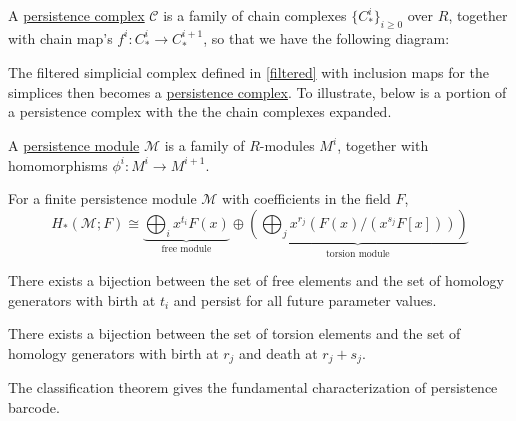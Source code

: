 \begin{defn}
A \underline{persistence complex} $\mathscr{C}$ is a family of chain complexes $\{C^i_*\}_{i\geq 0 }$ over $R$, together with chain map's $f^i: C^i_* \to C^{i+1}_*$, so that we have the following diagram:


The filtered simplicial complex defined in \ref{filtered} with inclusion maps for the simplices then becomes a \underline{persistence complex}. To illustrate, below is a portion of a persistence complex with the the chain complexes expanded. 

\end{defn}

\begin{defn}
A \underline{persistence module} $\mathscr{M}$ is a family of $R$-modules $M^i$, together with homomorphisms $\phi^i: M^i \to M^{i+1}$.
\end{defn}

\begin{thm}
    For a finite persistence module $\mathscr{M}$ with coefficients in the field $F$, 
    \begin{equation}
        H_*(\mathscr{M}; F) \cong \underbrace{\bigoplus_i x^{t_i}F(x)}_\text{free module} \oplus  \underbrace{\left(\bigoplus_j x^{r_j}(F(x)/(x^{s_j}F[x]))\right)}_\text{torsion module}
    \end{equation}
    
    There exists a bijection between the set of free elements and the set of homology generators with birth at $t_i$ and persist for all future parameter values. 
    
    There exists a bijection between the set of torsion elements and the set of homology generators with birth at $r_j$ and death at $r_j + s_j$. 
    
    The classification theorem gives the fundamental characterization of persistence barcode.
\end{thm}

